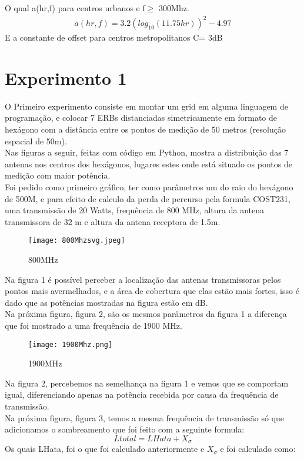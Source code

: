 \documentclass[12pt]{article}
\begin{document}
O qual a(hr,f) para centros urbanos e f$\geq$ 300Mhz.
\begin{eqnarray}
a(hr,f)=3.2(log_{10}(11.75hr))^{2} -4.97
\end{eqnarray}
E a constante de offset para centros metropolitanos C= 3dB



\section{Experimento 1} \label{sec:firstpage}
O Primeiro experimento consiste em montar um grid em alguma linguagem de programação, e colocar 7 ERBs distanciadas simetricamente em formato de hexágono com a distância entre os pontos de medição de 50 metros (resolução espacial de 50m). \\
Nas figuras a seguir, feitas com código em Python, mostra a distribuição das 7 antenas nos centros dos hexágonos, lugares estes onde está situado os pontos de medição com maior potência.\\
Foi pedido como primeiro gráfico, ter como parâmetros um do raio do hexágono de 500M, e para efeito de calculo da perda de percurso pela formula COST231, uma transmissão de 20 Watts, frequência de 800 MHz, altura da antena transmissora de 32 m e altura da antena receptora de 1.5m.
\begin{figure}[!h]
\centering
    \texttt{[image: 800Mhzsvg.jpeg]}
    \caption{800MHz}
\end{figure}
\FloatBarrier
Na figura 1 é possível perceber a localização das antenas transmissoras pelos pontos mais avermelhados, e a área de cobertura que elas estão mais fortes, isso é dado que as potências mostradas na figura estão em dB.\\
Na próxima figura, figura 2, são os mesmos parâmetros da figura 1 a diferença que foi mostrado a uma frequência de 1900 MHz.
\begin{figure}[h!]
    \texttt{[image: 1900Mhz.png]}
    \caption{1900MHz}
\end{figure}
\FloatBarrier
Na figura 2, percebemos na semelhança na figura 1 e vemos que se comportam igual, diferenciando apenas na potência recebida por causa da frequência de transmissão.\\
Na próxima figura, figura 3, temos a mesma frequência de transmissão só que adicionamos o sombreamento que foi feito com a seguinte formula:
\begin{equation}
    Ltotal=LHata+X{_{\sigma }}
\end{equation}
Os quais LHata, foi o que foi calculado anteriormente e $X{_{\sigma }}$ e foi calculado como:
\end{document}
